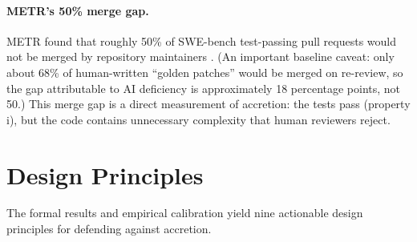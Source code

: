 \documentclass[11pt, a4paper, logo, copyright]{googledeepmind}
\begin{document}
\paragraph{METR's 50\% merge gap.} METR found that roughly 50\% of SWE-bench test-passing pull requests would not be merged by repository maintainers \citep{metr2026swebench}. (An important baseline caveat: only about 68\% of human-written ``golden patches'' would be merged on re-review, so the gap attributable to AI deficiency is approximately 18 percentage points, not 50.) This merge gap is a direct measurement of accretion: the tests pass (property i), but the code contains unnecessary complexity that human reviewers reject.


\section{Design Principles}
\label{sec:principles}

The formal results and empirical calibration yield nine actionable design principles for defending against accretion.
\end{document}

